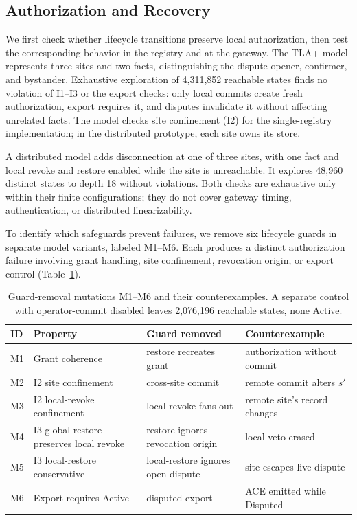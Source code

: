 \documentclass[journal]{IEEEtran}
\theoremstyle{definition}
\begin{document}
\subsection{Authorization and Recovery}
\label{sec:lifecycle-results}
We first check whether lifecycle transitions preserve local authorization, then test the corresponding behavior in the registry and at the gateway. The TLA+ model represents three sites and two facts, distinguishing the dispute opener, confirmer, and bystander. Exhaustive exploration of 4,311,852 reachable states finds no violation of I1--I3 or the export checks: only local commits create fresh authorization, export requires it, and disputes invalidate it without affecting unrelated facts. The model checks site confinement (I2) for the single-registry implementation; in the distributed prototype, each site owns its store.

A distributed model adds disconnection at one of three sites, with one fact and local revoke and restore enabled while the site is unreachable. It explores 48,960 distinct states to depth 18 without violations. Both checks are exhaustive only within their finite configurations; they do not cover gateway timing, authentication, or distributed linearizability.

To identify which safeguards prevent failures, we remove six lifecycle guards in separate model variants, labeled M1--M6. Each produces a distinct authorization failure involving grant handling, site confinement, revocation origin, or export control (Table~\ref{tab:tla}).

\begin{table}[t]
\centering
\caption{Guard-removal mutations M1--M6 and their counterexamples. A separate control with operator-commit disabled leaves 2,076,196 reachable states, none Active.}
\label{tab:tla}
\scriptsize
\begin{tabular}{@{}p{0.35cm}p{2.05cm}p{1.85cm}p{1.95cm}@{}}
\toprule
ID & Property & Guard removed & Counterexample \\
\midrule
M1 & Grant coherence & restore recreates grant & authorization without commit \\
M2 & I2 site confinement & cross-site commit & remote commit alters $s'$ \\
M3 & I2 local-revoke confinement & local-revoke fans out & remote site's record changes \\
M4 & I3 global restore preserves local revoke & restore ignores revocation origin & local veto erased \\
M5 & I3 local-restore conservative & local-restore ignores open dispute & site escapes live dispute \\
M6 & Export requires Active & disputed export & ACE emitted while Disputed \\
\bottomrule
\end{tabular}
\end{table}
\end{document}
